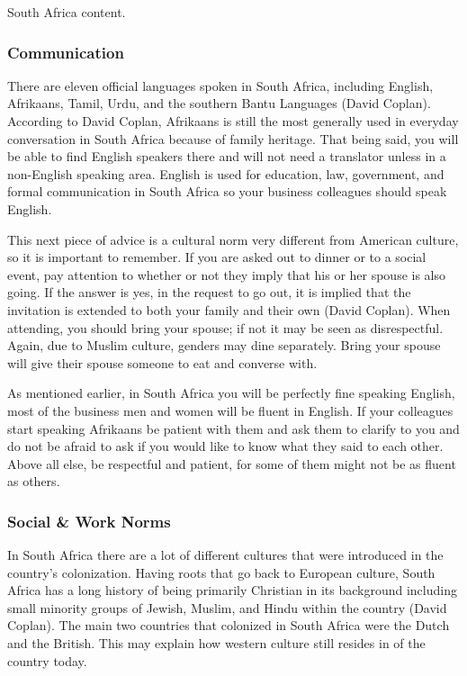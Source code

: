 \documentclass[11pt,a4paper,oneside]{report}
\begin{document}
South Africa content.

\subsubsection{Communication}\label{third}

There are eleven official languages spoken in South Africa, including English,
Afrikaans, Tamil, Urdu, and the southern Bantu Languages (David Coplan).
According to David Coplan, Afrikaans is still the most generally used in
everyday conversation in South Africa because of family heritage. That being
said, you will be able to find English speakers there and will not need a
translator unless in a non-English speaking area. English is used for
education, law, government, and formal communication in South Africa so your
business colleagues should speak English.


This next piece of advice is a cultural norm very different from American
culture, so it is important to remember. If you are asked out to dinner or to a
social event, pay attention to whether or not they imply that his or her spouse
is also going. If the answer is yes, in the request to go out, it is implied
that the invitation is extended to both your family and their own (David
Coplan). When attending, you should bring your spouse; if not it may be seen as
disrespectful. Again, due to Muslim culture, genders may dine separately. Bring
your spouse will give their spouse someone to eat and converse with.

As mentioned earlier, in South Africa you will be perfectly fine speaking
English, most of the business men and women will be fluent in English. If your
colleagues start speaking Afrikaans be patient with them and ask them to
clarify to you and do not be afraid to ask if you would like to know what they
said to each other. Above all else, be respectful and patient, for some of them
might not be as fluent as others.

\subsubsection{Social \& Work Norms}\label{third}

In South Africa there are a lot of different cultures that were introduced in
the country’s colonization. Having roots that go back to European culture,
South Africa has a long history of being primarily Christian in its background
including small minority groups of Jewish, Muslim, and Hindu within the country
(David Coplan). The main two countries that colonized in South Africa were the
Dutch and the British. This may explain how western culture still resides in of
the country today.
\end{document}
